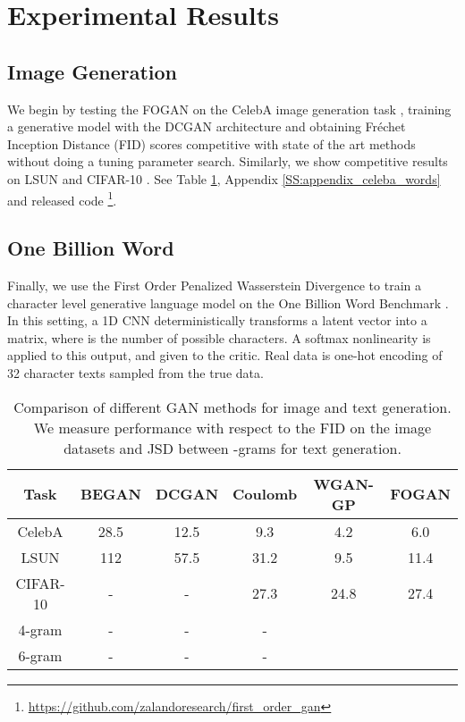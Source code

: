 \documentclass{article}
\begin{document}
 \section{Experimental Results}\label{S:experiments}

 \subsection{Image Generation}
 We begin by testing the FOGAN on the CelebA image generation task \cite{liu2015deep},
 training a generative model with the DCGAN  architecture \cite{radford2015unsupervised} and obtaining Fr\'echet Inception Distance (FID) scores \cite{heusel2017gans}
 competitive with state of the art methods without doing a tuning parameter search.
 Similarly, we show competitive results on LSUN \cite{yu15lsun} and CIFAR-10 \cite{krizhevsky2009learning}.
 See Table \ref{Ta:results}, Appendix \ref{SS:appendix_celeba_words} and released code
 \footnote{\scriptsize{\url{https://github.com/zalandoresearch/first_order_gan}}}.

 \subsection{One Billion Word}
 Finally, we use the First Order Penalized Wasserstein Divergence to train a character level generative language model on the
 One Billion Word Benchmark \cite{chelba2013one}. In this setting, a 1D CNN deterministically transforms a latent
 vector into a  matrix, where  is the number of possible characters.
 A softmax nonlinearity is applied to this output, and given to the critic.
 Real data is one-hot encoding of 32 character texts sampled from the true data.
 
  \begin{table}
\caption{Comparison of different GAN methods for image and text generation.
We measure performance with respect to the FID on the image datasets
and JSD between -grams for text generation.}\label{Ta:results}
\centering
\begin{scriptsize}
  \begin{tabular}{cccccc}\toprule
  Task & BEGAN & DCGAN & Coulomb & WGAN-GP & FOGAN \\ \midrule
  CelebA & 28.5 & 12.5 & 9.3 & 4.2 & 6.0 \\
  LSUN & 112 & 57.5 & 31.2 &  9.5 & 11.4 \\
  CIFAR-10 & - & - & 27.3 & 24.8 & 27.4 \\
  4-gram & -    & -    & -   &  &  \\
  6-gram & - & - & -   &  &  \\ \bottomrule
  \end{tabular}
 \end{scriptsize}
 \end{table}
\end{document}
